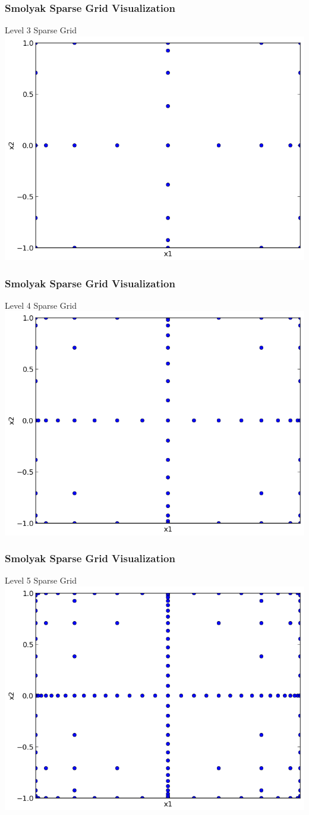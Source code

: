 \documentclass{beamer}
\begin{document}
\begin{frame}

\frametitle{Smolyak Sparse Grid Visualization}
\centering
Level 3 Sparse Grid
\includegraphics[width=.75\textwidth]{./sparse_grid_L3.png}

\end{frame}
\begin{frame}

\frametitle{Smolyak Sparse Grid Visualization}
\centering
Level 4 Sparse Grid
\includegraphics[width=.75\textwidth]{./sparse_grid_L4.png}

\end{frame}
\begin{frame}

\frametitle{Smolyak Sparse Grid Visualization}
\centering
Level 5 Sparse Grid
\includegraphics[width=.75\textwidth]{./sparse_grid_L5.png}

\end{frame}
\end{document}
